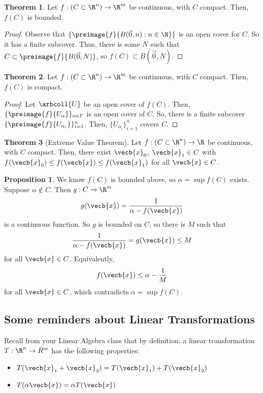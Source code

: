 \documentclass[a5paper]{article}
\theoremstyle{definition}%
\newtheorem{theorem}{Theorem}
\newtheorem*{proposition*}{Proposition}
\numberwithin{exercise}{section}
\theoremstyle{remark}%
\begin{document}
\pagebreak
\begin{theorem}
Let $f:(C\subset\R^n)\to\R^m$ be continuous, with $C$ compact. Then, $f(C)$ is bounded.
\end{theorem}
\begin{proof}
Observe that $\{\preimage{f}{B(\vec{0},n):n\in \N}\}$ is an open cover for $C$. So it has a finite subcover. Thus, there is some $N$ such that $C\subset \preimage{f}{B(\vec{0},N)}$, so $f(C)\subset B(\vec{0},N)$. 
\end{proof}

\begin{highlight}
\begin{theorem}
Let $f:(C\subset\R^n)\to\R^m$ be continuous, with $C$ compact. Then, $f(C)$ is compact.
\end{theorem}
\end{highlight}
\begin{proof}
Let $\arbcoll{U}$ be an open cover of $f(C)$. Then, $\{\preimage{f}{U_\alpha}\}_{\alpha\in \Gamma}$ is an open cover of $C$. So, there is a finite subcover $\{\preimage{f}{U_{\alpha_i}}\}_{i=1}^{n}$. Then, $\{{U_{\alpha_i}}\}_{i=1}^{n}$ covers $C$. 
\end{proof}

\begin{highlight}
\begin{theorem}[Extreme Value Theorem]
Let $f:(C\subset\R^n)\to\R$ be continuous, with $C$ compact. Then, there exist $\vecb{x}_0$, $\vecb{x}_1 \in C$ with $f(\vecb{x}_0)\leq f(\vecb{x})\leq f(\vecb{x}_1)$ for all $\vecb{x}\in C$. 
\end{theorem}
\end{highlight}
\begin{proposition*}
We know $f(C)$ is bounded above, so $\alpha=\sup f(C)$ exists. Suppose $\alpha\not\in C$.  Then $g:C\to \R^m$ 
$$g(\vecb{x})=\frac{1}{\alpha-f(\vecb{x})}$$
is a continuous function. So $g$ is bounded on $C$, so there is $M$ such that 
$$\frac{1}{\alpha-f(\vecb{x})}=g(\vecb{x})\leq M$$
for all $\vecb{x}\in C$. Equivalently, 
$$f(\vecb{x})\leq \alpha-\frac{1}{M}$$ 
for all $\vecb{x}\in C$, which contradicts $\alpha=\sup f(C)$. 
\end{proposition*}

\subsection{Some reminders about Linear Transformations}

Recall from your Linear Algebra class that by definition, a linear transformation $T:\R^n\to R^m$ has the following properties:
\begin{itemize}
\item $T(\vecb{x}_1+\vecb{x}_2)=T(\vecb{x}_1)+T(\vecb{x}_2)$
\item $T(\alpha\vecb{x})=\alpha T(\vecb{x})$
\end{itemize}
\end{document}
